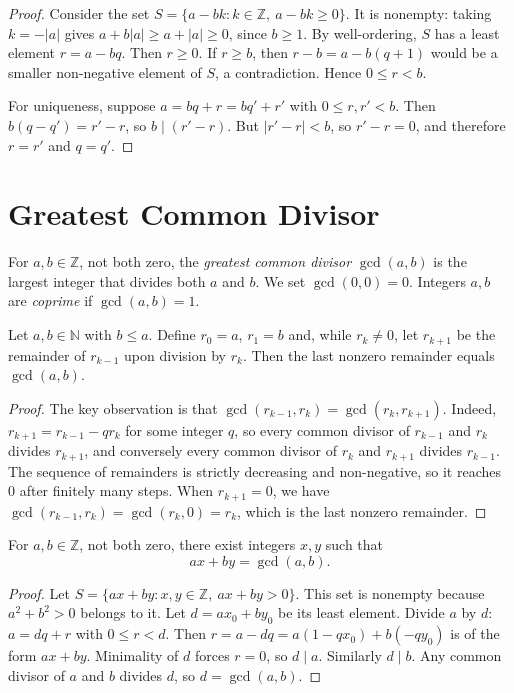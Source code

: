\begin{proof}
Consider the set $S=\{a-bk : k\in\mathbb{Z},\ a-bk\ge 0\}$. It is nonempty: taking $k=-|a|$ gives $a+b|a|\ge a+|a|\ge 0$, since $b\ge 1$. By well-ordering, $S$ has a least element $r=a-bq$. Then $r\ge 0$. If $r\ge b$, then $r-b=a-b(q+1)$ would be a smaller non-negative element of $S$, a contradiction. Hence $0\le r<b$.

For uniqueness, suppose $a=bq+r=bq'+r'$ with $0\le r,r'<b$. Then $b(q-q')=r'-r$, so $b\mid (r'-r)$. But $|r'-r|<b$, so $r'-r=0$, and therefore $r=r'$ and $q=q'$.
\end{proof}

\section{Greatest Common Divisor}

\begin{definition}
For $a,b\in\mathbb{Z}$, not both zero, the \emph{greatest common divisor} $\gcd(a,b)$ is the largest integer that divides both $a$ and $b$. We set $\gcd(0,0)=0$. Integers $a,b$ are \emph{coprime} if $\gcd(a,b)=1$.
\end{definition}

\begin{theorem}\label{thm:euclid}
Let $a,b\in\mathbb{N}$ with $b\le a$. Define $r_0=a$, $r_1=b$ and, while $r_{k}\neq 0$, let $r_{k+1}$ be the remainder of $r_{k-1}$ upon division by $r_k$. Then the last nonzero remainder equals $\gcd(a,b)$.
\end{theorem}

\begin{proof}
The key observation is that $\gcd(r_{k-1},r_k)=\gcd(r_k,r_{k+1})$. Indeed, $r_{k+1}=r_{k-1}-q r_k$ for some integer $q$, so every common divisor of $r_{k-1}$ and $r_k$ divides $r_{k+1}$, and conversely every common divisor of $r_k$ and $r_{k+1}$ divides $r_{k-1}$. The sequence of remainders is strictly decreasing and non-negative, so it reaches $0$ after finitely many steps. When $r_{k+1}=0$, we have $\gcd(r_{k-1},r_k)=\gcd(r_k,0)=r_k$, which is the last nonzero remainder.
\end{proof}

\begin{theorem}\label{thm:bezout}
For $a,b\in\mathbb{Z}$, not both zero, there exist integers $x,y$ such that
\[
  ax+by=\gcd(a,b).
\]
\end{theorem}

\begin{proof}
Let $S=\{ax+by : x,y\in\mathbb{Z},\ ax+by>0\}$. This set is nonempty because $a^2+b^2>0$ belongs to it. Let $d=ax_0+by_0$ be its least element. Divide $a$ by $d$: $a=dq+r$ with $0\le r<d$. Then $r=a-dq=a(1-qx_0)+b(-qy_0)$ is of the form $ax+by$. Minimality of $d$ forces $r=0$, so $d\mid a$. Similarly $d\mid b$. Any common divisor of $a$ and $b$ divides $d$, so $d=\gcd(a,b)$.
\end{proof}

